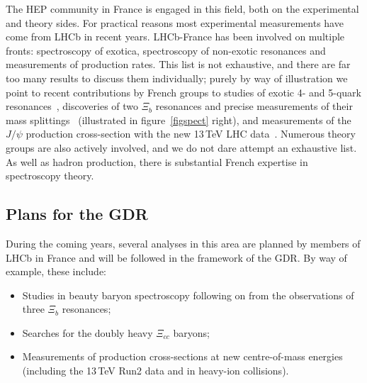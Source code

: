 The HEP community in France is engaged in this field, both on
the experimental and theory sides. For practical reasons most
experimental measurements have come from LHCb in recent years.
LHCb-France has been involved on multiple fronts:
spectroscopy of exotica,  %
spectroscopy of non-exotic resonances %
and measurements of production rates.  %
This list is not exhaustive, and there are far too many
results to discuss them individually; purely by way of
illustration we point to recent contributions by French groups to 
%
studies of exotic 4- and 5-quark resonances~\cite{Aaij:2016ymb, Aaij:2014jqa}, 
%
discoveries of two $\Xi_b$ resonances and precise measurements
of their mass splittings~\cite{Aaij:2016jnn, Aaij:2014yka} (illustrated in figure~\ref{figspect} right), 
%
and measurements of the $J/\psi$ production cross-section
with the new 13\,TeV LHC data~\cite{Aaij:2015rla}.
Numerous theory groups are also actively involved, and
we do not dare attempt an exhaustive list. %
As well as hadron production, there is substantial French
expertise in spectroscopy theory. 



%






\subsection*{Plans for the GDR}
During the coming years, several analyses in this area are
planned by members of LHCb in France and will be followed in the framework of the GDR.  
By way of example, these include:
%
\begin{itemize}
\item Studies in beauty baryon spectroscopy following on from the observations
of three $\Xi_b$ resonances;
\item Searches for the doubly heavy
$\Xi_{cc}$ baryons;
\item Measurements of production cross-sections
at new centre-of-mass energies (including the 13\,TeV Run2
data and in heavy-ion collisions).
\end{itemize}

